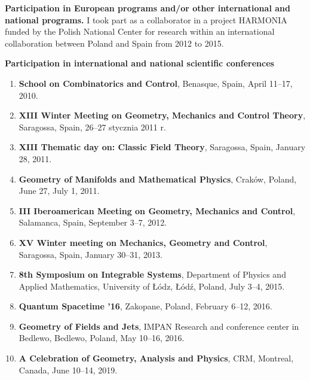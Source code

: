 \documentclass[12pt,reqno]{amsbook}
\begin{document}
{\bf Participation in European programs and/or other international and national programs.}
\vskip 0.5cm
I took part as a collaborator in a project HARMONIA funded by the Polish National Center for research within an international collaboration between Poland and Spain from 2012 to 2015. 
\vskip 0.5cm

{\bf  Participation in international and national scientific conferences}
\vskip 0.5cm

\begin{enumerate}

\item {\bf School on Combinatorics and Control}, Benasque, Spain, April 11--17,  2010.
\item {\bf XIII Winter Meeting on Geometry, Mechanics and Control Theory}, Saragossa, Spain,  26--27 stycznia 2011 r.
\item {\bf XIII Thematic day on: Classic Field Theory}, Saragossa, Spain,  January 28, 2011.
\item {\bf Geometry of Manifolds and Mathematical Physics}, Crak\'ow, Poland,  June 27, July 1, 2011.
\item {\bf III Iberoamerican Meeting on Geometry, Mechanics and Control}, Salamanca, Spain, September 3--7,  2012.
\item  {\bf XV Winter meeting on Mechanics, Geometry and Control}, Saragossa, Spain, January 30--31, 2013.
\item  {\bf 8th Symposium on Integrable Systems},  Department of Physics and Applied Mathematics, University of \L\'odz, \L\'od\'z, Poland, July 3--4, 2015.
\item  {\bf Quantum Spacetime '16},  Zakopane, Poland, February 6--12, 2016.
\item  {\bf Geometry of Fields and Jets},  IMPAN Research and conference center in  Bedlewo, Bedlewo, Poland, May 10--16, 2016.
\item  {\bf A Celebration of Geometry, Analysis and Physics}, CRM, Montreal, Canada, June 10--14, 2019.

\end{enumerate}
\vskip 0.5cm
\end{document}
